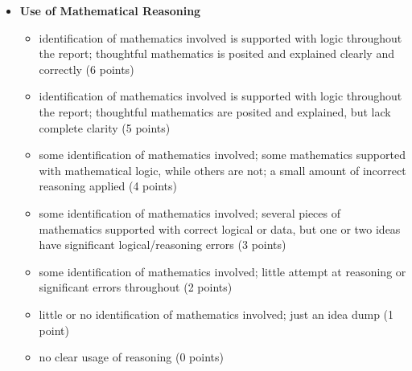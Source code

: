 \documentclass[11pt,letterpaper]{article}
\begin{document}
\begin{itemize}
\item \textbf{Use of Mathematical Reasoning}
\begin{itemize}
\item[\underline{\hspace{.2in}}] identification of mathematics involved is supported with logic throughout the report; thoughtful mathematics is posited and explained clearly and correctly (6 points)
\item[\underline{\hspace{.2in}}] identification of mathematics involved is supported with logic throughout the report; thoughtful mathematics are posited and explained, but lack complete clarity (5 points)
\item[\underline{\hspace{.2in}}] some identification of mathematics involved; some mathematics supported with mathematical logic, while others are not; a small amount of incorrect reasoning applied (4 points)
\item[\underline{\hspace{.2in}}] some  identification of mathematics involved; several pieces of mathematics supported with correct logical or data, but one or two ideas have significant logical/reasoning errors (3 points)
\item[\underline{\hspace{.2in}}] some  identification of mathematics involved; little attempt at reasoning or significant errors throughout (2 points)
\item[\underline{\hspace{.2in}}] little or no identification of mathematics involved; just an idea dump (1 point)
\item[\underline{\hspace{.2in}}] no clear usage of reasoning (0 points)
\end{itemize}


\end{itemize}
\end{document}
